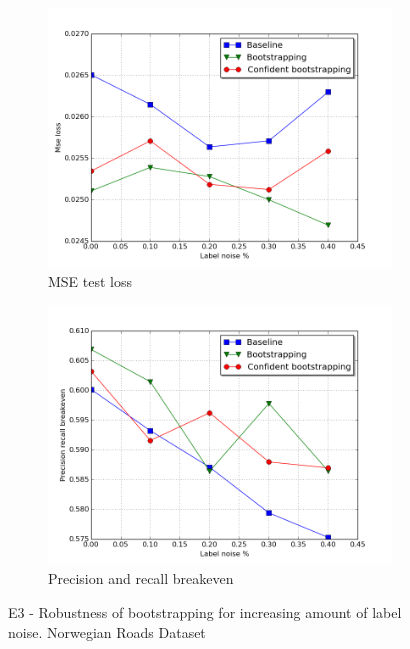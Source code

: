 \begin{figure}
\begin{subfigure}{0.48\textwidth}
\includegraphics[width=\linewidth]{figs/E5/E5_lc_noise.png}
\caption{MSE test loss} \label{fig:E5_boot_norway_loss}
\end{subfigure}
\hspace*{\fill} %
\begin{subfigure}{0.48\textwidth}
\includegraphics[width=\linewidth]{figs/E5/E5_pr_noise.png}
\caption{Precision and recall breakeven} \label{fig:E5_boot_norway_pr}
\end{subfigure}
\hspace*{\fill} %
\caption{E3 - Robustness of bootstrapping for increasing amount of label noise. Norwegian Roads Dataset} \label{fig:E5_boot_norway}
\end{figure}


